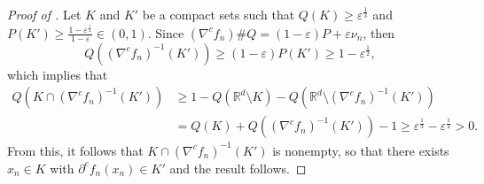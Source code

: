 \documentclass[11pt]{article}
\newcommand{\RR}{\mathbb{R}}
\newcommand{\R}{\RR}
\theoremstyle{plain}
\theoremstyle{definition}\newtheorem{definition}[theorem]{Definition}
\theoremstyle{remark}
\begin{document}
    \begin{proof}[Proof of ]
    Let $K$ and $K'$ be a compact sets such that   $Q(K)\geq \varepsilon^{\frac{1}{3}} $ and $P(K')\geq \frac{1-\varepsilon^{\frac{1}{2}}}{1-\varepsilon} \in (0,1)$. Since $(\nabla^c f_n)\# Q=  (1-\varepsilon)P+\varepsilon \nu_n$,  then   $$ Q((\nabla^c f_n)^{-1}(K')) \geq (1-\varepsilon) P(K')\geq  1-\varepsilon^{\frac{1}{2}} , $$
   which implies that
   \begin{align*}
       Q( K\cap (\nabla^c f_n)^{-1}(K')) &\geq   1-  Q( \R^d\setminus K) - Q( \R^d\setminus (\nabla^c f_n)^{-1}(K') )\\
       &=  Q( K) + Q((\nabla^c f_n)^{-1}(K') ) -1 \geq \varepsilon^{\frac{1}{3}} - \varepsilon^{\frac{1}{2}}>0. 
   \end{align*}
From this, it follows that $K\cap (\nabla^c f_n)^{-1}(K')$ is nonempty, so that there exists $x_n\in K$ with $\partial^c f_n(x_n)\in K'$ and the result follows.  
\end{proof}








\end{document}
